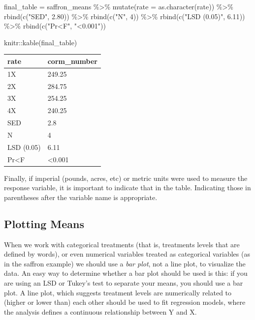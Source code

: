 \documentclass[
]{book}
\newenvironment{Shaded}{\begin{snugshade}}{\end{snugshade}}
\newcommand{\AttributeTok}[1]{\textcolor[rgb]{0.77,0.63,0.00}{#1}}
\newcommand{\DecValTok}[1]{\textcolor[rgb]{0.00,0.00,0.81}{#1}}
\newcommand{\FloatTok}[1]{\textcolor[rgb]{0.00,0.00,0.81}{#1}}
\newcommand{\FunctionTok}[1]{\textcolor[rgb]{0.00,0.00,0.00}{#1}}
\newcommand{\NormalTok}[1]{#1}
\newcommand{\OtherTok}[1]{\textcolor[rgb]{0.56,0.35,0.01}{#1}}
\newcommand{\SpecialCharTok}[1]{\textcolor[rgb]{0.00,0.00,0.00}{#1}}
\newcommand{\StringTok}[1]{\textcolor[rgb]{0.31,0.60,0.02}{#1}}
\begin{document}
\begin{Shaded}
\begin{Highlighting}[]
\NormalTok{final\_table }\OtherTok{=}\NormalTok{ saffron\_means }\SpecialCharTok{\%\textgreater{}\%}
  \FunctionTok{mutate}\NormalTok{(}\AttributeTok{rate =} \FunctionTok{as.character}\NormalTok{(rate)) }\SpecialCharTok{\%\textgreater{}\%}
  \FunctionTok{rbind}\NormalTok{(}\FunctionTok{c}\NormalTok{(}\StringTok{"SED"}\NormalTok{, }\FloatTok{2.80}\NormalTok{)) }\SpecialCharTok{\%\textgreater{}\%}
  \FunctionTok{rbind}\NormalTok{(}\FunctionTok{c}\NormalTok{(}\StringTok{"N"}\NormalTok{, }\DecValTok{4}\NormalTok{)) }\SpecialCharTok{\%\textgreater{}\%}
  \FunctionTok{rbind}\NormalTok{(}\FunctionTok{c}\NormalTok{(}\StringTok{"LSD (0.05)"}\NormalTok{, }\FloatTok{6.11}\NormalTok{)) }\SpecialCharTok{\%\textgreater{}\%}
  \FunctionTok{rbind}\NormalTok{(}\FunctionTok{c}\NormalTok{(}\StringTok{"Pr\textless{}F"}\NormalTok{, }\StringTok{"\textless{}0.001"}\NormalTok{))}

\NormalTok{knitr}\SpecialCharTok{::}\FunctionTok{kable}\NormalTok{(final\_table)}
\end{Highlighting}
\end{Shaded}

\begin{tabular}{l|l}
\hline
rate & corm\_number\\
\hline
1X & 249.25\\
\hline
2X & 284.75\\
\hline
3X & 254.25\\
\hline
4X & 240.25\\
\hline
SED & 2.8\\
\hline
N & 4\\
\hline
LSD (0.05) & 6.11\\
\hline
Pr<F & <0.001\\
\hline
\end{tabular}

Finally, if imperial (pounds, acres, etc) or metric units were used to measure the response variable, it is important to indicate that in the table. Indicating those in parentheses after the variable name is appropriate.

\hypertarget{plotting-means}{%
\subsection{Plotting Means}\label{plotting-means}}

When we work with categorical treatments (that is, treatments levels that are defined by words), or even numerical variables treated as categorical variables (as in the saffron example) we should use a \emph{bar plot}, not a line plot, to visualize the data. An easy way to determine whether a bar plot should be used is this: if you are using an LSD or Tukey's test to separate your means, you should use a bar plot. A line plot, which suggests treatment levels are numerically related to (higher or lower than) each other should be used to fit regression models, where the analysis defines a continuous relationship between Y and X.
\end{document}
